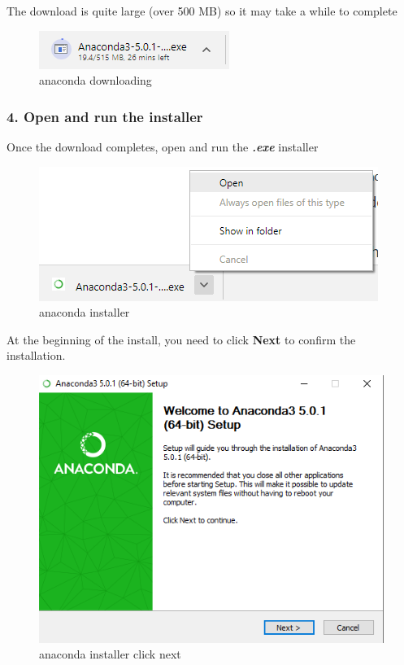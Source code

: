 \documentclass{book}
\makeatletter
\def\maxwidth{\ifdim\Gin@nat@width>\linewidth\linewidth
    \else\Gin@nat@width\fi}
\let\Oldincludegraphics\includegraphics
\renewcommand{\includegraphics}[1]{\Oldincludegraphics[width=.8\maxwidth]{#1}}
\makeatother
\begin{document}
The download is quite large (over 500 MB) so it may take a while to
complete

\begin{figure}
\centering
\includegraphics{images/anaconda_downloading.png}
\caption{anaconda downloading}
\end{figure}
    




    
        \subsubsection{4. Open and run the
installer}\label{open-and-run-the-installer}

Once the download completes, open and run the \textbf{\emph{.exe}}
installer

\begin{figure}
\centering
\includegraphics{images/anaconda_run_installer.png}
\caption{anaconda installer}
\end{figure}

At the beginning of the install, you need to click \textbf{Next} to
confirm the installation.

\begin{figure}
\centering
\includegraphics{images/anaconda_installer_click_next.png}
\caption{anaconda installer click next}
\end{figure}
\end{document}
